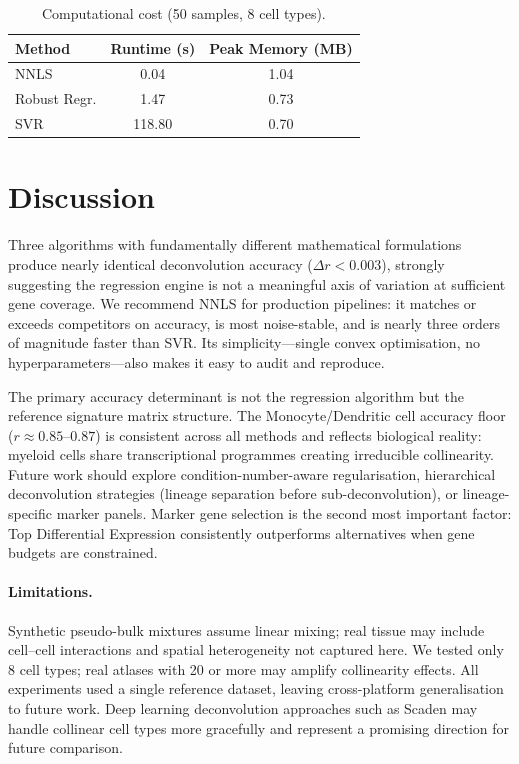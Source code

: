 \documentclass[10pt,twocolumn]{article}
\begin{document}
\begin{table}[t]
\centering
\caption{Computational cost (50 samples, 8 cell types).}
\label{tab:runtime}
\small
\begin{tabular}{lcc}
\toprule
Method & Runtime (s) & Peak Memory (MB) \\
\midrule
NNLS         & 0.04   & 1.04 \\
Robust Regr. & 1.47   & 0.73 \\
SVR          & 118.80 & 0.70 \\
\bottomrule
\end{tabular}
\end{table}

\section{Discussion}

Three algorithms with fundamentally different mathematical formulations
produce nearly identical deconvolution accuracy ($\Delta r<0.003$), strongly
suggesting the regression engine is not a meaningful axis of variation at
sufficient gene coverage. We recommend NNLS for production pipelines: it
matches or exceeds competitors on accuracy, is most noise-stable, and is
nearly three orders of magnitude faster than SVR. Its simplicity---single
convex optimisation, no hyperparameters---also makes it easy to audit and
reproduce.

The primary accuracy determinant is not the regression algorithm but the
reference signature matrix structure. The Monocyte/Dendritic cell accuracy
floor ($r\approx0.85$--$0.87$) is consistent across all methods and reflects
biological reality: myeloid cells share transcriptional programmes creating
irreducible collinearity. Future work should explore condition-number-aware
regularisation, hierarchical deconvolution strategies (lineage separation
before sub-deconvolution), or lineage-specific marker panels. Marker gene
selection is the second most important factor: Top Differential Expression
consistently outperforms alternatives when gene budgets are constrained.

\paragraph{Limitations.}
Synthetic pseudo-bulk mixtures assume linear mixing; real tissue may include
cell--cell interactions and spatial heterogeneity not captured here. We tested
only 8 cell types; real atlases with 20 or more may amplify collinearity
effects. All experiments used a single reference dataset, leaving
cross-platform generalisation to future work. Deep learning deconvolution
approaches such as Scaden \citep{menden2020} may handle collinear cell types
more gracefully and represent a promising direction for future comparison.
\end{document}
